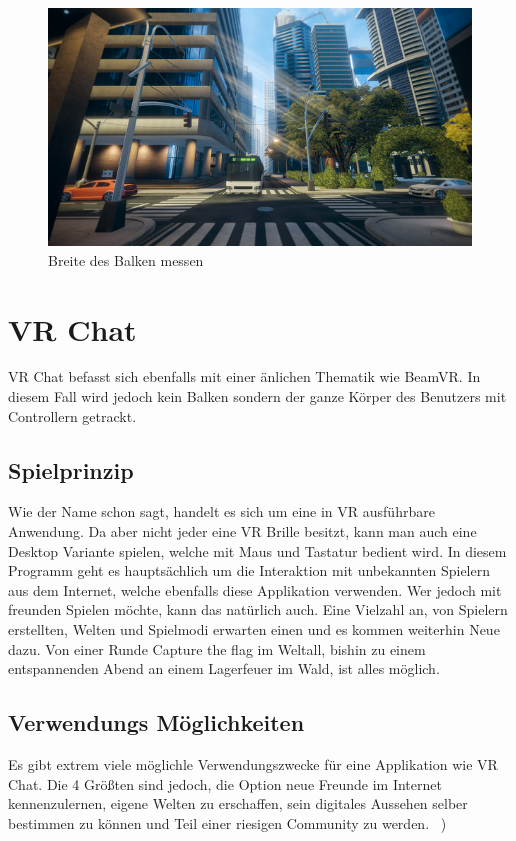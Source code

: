 \begin {figure}
    \includegraphics[scale=0.7]{pics/richiesplankexperience_world}
    \caption{Breite des Balken messen}
    \label{fig:richiesplankexperience_world}
\end {figure}


\section{VR Chat}
\label{sec:vrchat}
VR Chat befasst sich ebenfalls mit einer \"anlichen Thematik wie BeamVR.
In diesem Fall wird jedoch kein Balken sondern der ganze K\"orper des Benutzers mit Controllern getrackt.

\subsection{Spielprinzip}
\label{sec:vrchat_principle}
Wie der Name schon sagt, handelt es sich um eine in VR ausf\"uhrbare Anwendung.
Da aber nicht jeder eine VR Brille besitzt, kann man auch eine Desktop Variante spielen, welche mit Maus und Tastatur bedient wird.
In diesem Programm geht es haupts\"achlich um die Interaktion mit unbekannten Spielern aus dem Internet,
welche ebenfalls diese Applikation verwenden.
Wer jedoch mit freunden Spielen möchte, kann das nat\"urlich auch.
Eine Vielzahl an, von Spielern erstellten, Welten und Spielmodi erwarten einen und es kommen weiterhin Neue dazu.
Von einer Runde Capture the flag im Weltall, bishin zu einem entspannenden Abend an einem Lagerfeuer im Wald, ist alles möglich.
~\cite{VRChat_2021_Steam}

\subsection{Verwendungs M\"oglichkeiten}
\label{sec:vrchat_usecases}
Es gibt extrem viele m\"oglichle Verwendungszwecke für eine Applikation wie VR Chat.
Die 4 Gr\"oßten sind jedoch, die Option neue Freunde im Internet kennenzulernen, eigene Welten zu erschaffen, sein digitales Aussehen selber bestimmen zu k\"onnen und Teil einer riesigen Community zu werden.
~\cite{VRChat_2021})

